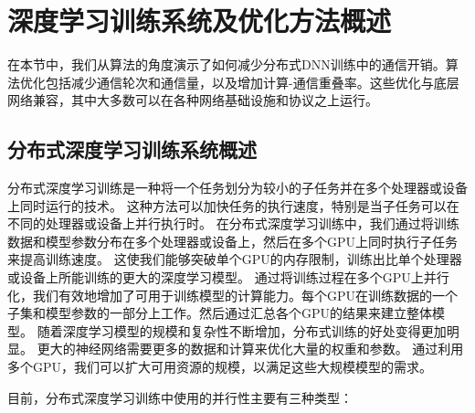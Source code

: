 \section{深度学习训练系统及优化方法概述}
在本节中，我们从算法的角度演示了如何减少分布式DNN训练中的通信开销。算法优化包括减少通信轮次和通信量，以及增加计算-通信重叠率。这些优化与底层网络兼容，其中大多数可以在各种网络基础设施和协议之上运行。

\subsection{分布式深度学习训练系统概述}

分布式深度学习训练是一种将一个任务划分为较小的子任务并在多个处理器或设备上同时运行的技术。
% 
这种方法可以加快任务的执行速度，特别是当子任务可以在不同的处理器或设备上并行执行时。
% 
在分布式深度学习训练中，我们通过将训练数据和模型参数分布在多个处理器或设备上，然后在多个GPU上同时执行子任务来提高训练速度。
% 
这使我们能够突破单个GPU的内存限制，训练出比单个处理器或设备上所能训练的更大的深度学习模型。
% 
通过将训练过程在多个GPU上并行化，我们有效地增加了可用于训练模型的计算能力。每个GPU在训练数据的一个子集和模型参数的一部分上工作。然后通过汇总各个GPU的结果来建立整体模型。
% 
随着深度学习模型的规模和复杂性不断增加，分布式训练的好处变得更加明显。
% 
更大的神经网络需要更多的数据和计算来优化大量的权重和参数。
% 
通过利用多个GPU，我们可以扩大可用资源的规模，以满足这些大规模模型的需求。

目前，分布式深度学习训练中使用的并行性主要有三种类型：

